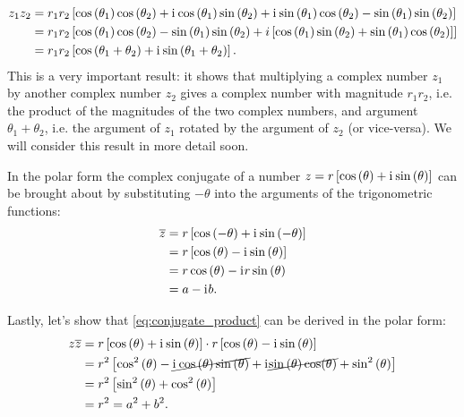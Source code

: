 \begin{align}
	z_{1}z_{2} &= r_{1}r_{2}\left[ \cos\left( \theta_{1} \right)\cos\left( \theta_{2} \right) + \mathrm{i}\mkern1mu\cos\left( \theta_{1} \right)\sin\left( \theta_{2} \right) + \mathrm{i}\mkern1mu\sin\left( \theta_{1} \right)\cos\left( \theta_{2} \right) -\sin\left( \theta_{1} \right)\sin\left( \theta_{2} \right) \right]\nonumber\\
	&= r_{1}r_{2}\left[ \cos\left( \theta_{1} \right)\cos\left( \theta_{2} \right)-\sin\left( \theta_{1} \right)\sin\left( \theta_{2} \right) + i\left[ \cos\left( \theta_{1} \right)\sin\left( \theta_{2} \right) + \sin\left( \theta_{1} \right)\cos\left( \theta_{2} \right) \right] \right]\nonumber\\
	&= r_{1}r_{2}\left[ \cos\left( \theta_{1}+\theta_{2} \right) + \mathrm{i}\mkern1mu\sin\left( \theta_{1}+\theta_{2} \right)  \right].
	\label{eq:complex_product_geometric_insight}
\end{align}
This is a very important result: it shows that multiplying a complex number $z_{1}$ by another complex number $z_{2}$ gives a complex number with magnitude $r_{1}r_{2}$, i.e. the product of the magnitudes of the two complex numbers, and argument $\theta_{1}+\theta_{2}$, i.e. the argument of $z_{1}$ rotated by the argument of $z_{2}$ (or vice-versa). We will consider this result in more detail soon.


In the polar form the complex conjugate of a number $z=r\left[ \cos\left( \theta \right) + \mathrm{i}\mkern1mu\sin\left( \theta \right) \right]$ can be brought about by substituting $-\theta$ into the arguments of the trigonometric functions:
\begin{align}
	\overline{z} &= r\left[ \cos\left( -\theta \right) + \mathrm{i}\mkern1mu\sin\left( -\theta \right) \right]\nonumber\\
	&= r\left[ \cos\left( \theta \right) - \mathrm{i}\mkern1mu\sin\left( \theta \right) \right]\nonumber\\
	&= r\cos\left( \theta \right) - \mathrm{i}\mkern1mu r\sin\left( \theta \right)\nonumber\\
	&= a-\mathrm{i}\mkern1mu b.
	\label{eq:complex_conjugation_geometric}
\end{align}

Lastly, let's show that \autoref{eq:conjugate_product} can be derived in the polar form:
\begin{align}
	z\overline{z} &= r\left[ \cos\left( \theta \right) + \mathrm{i}\mkern1mu\sin\left( \theta \right) \right] \cdot r\left[ \cos\left( \theta \right) - \mathrm{i}\mkern1mu\sin\left( \theta \right) \right]\nonumber\\
	&= r^{2}\left[ \cos^{2}\left( \theta \right) -\cancel{\mathrm{i}\mkern1mu\cos\left( \theta \right)\sin\left( \theta \right)} +\mathrm{i}\mkern1mu\cancel{\sin\left( \theta \right)\cos(\theta)} + \sin^{2}\left( \theta \right) \right]\nonumber\\
	&= r^{2}\left[ \sin^{2}\left( \theta \right) + \cos^{2}\left( \theta \right) \right]\nonumber\\
	&= r^{2} = a^{2}+b^{2}.
	\label{eq:conjugate_product_geometric}
\end{align}


